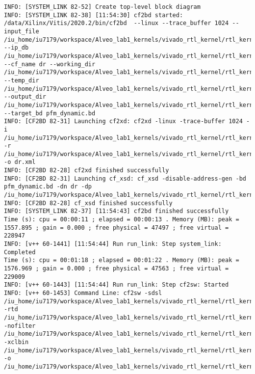 \begin{lstlisting}[label=func,breaklines=true,breakatwhitespace=false,caption=СОДЕРЖИМОЕ LOG-ФАЙЛА.]
INFO: [SYSTEM_LINK 82-52] Create top-level block diagram
INFO: [SYSTEM_LINK 82-38] [11:54:30] cf2bd started: /data/Xilinx/Vitis/2020.2/bin/cf2bd  --linux --trace_buffer 1024 --input_file /iu_home/iu7179/workspace/Alveo_lab1_kernels/vivado_rtl_kernel/rtl_kernel_wizard_0_ex/exports/_x/link/sys_link/cfgraph/cfgen_cfgraph.xml --ip_db /iu_home/iu7179/workspace/Alveo_lab1_kernels/vivado_rtl_kernel/rtl_kernel_wizard_0_ex/exports/_x/link/sys_link/_sysl/.cdb/xd_ip_db.xml --cf_name dr --working_dir /iu_home/iu7179/workspace/Alveo_lab1_kernels/vivado_rtl_kernel/rtl_kernel_wizard_0_ex/exports/_x/link/sys_link/_sysl/.xsd --temp_dir /iu_home/iu7179/workspace/Alveo_lab1_kernels/vivado_rtl_kernel/rtl_kernel_wizard_0_ex/exports/_x/link/sys_link --output_dir /iu_home/iu7179/workspace/Alveo_lab1_kernels/vivado_rtl_kernel/rtl_kernel_wizard_0_ex/exports/_x/link/int --target_bd pfm_dynamic.bd
INFO: [CF2BD 82-31] Launching cf2xd: cf2xd -linux -trace-buffer 1024 -i /iu_home/iu7179/workspace/Alveo_lab1_kernels/vivado_rtl_kernel/rtl_kernel_wizard_0_ex/exports/_x/link/sys_link/cfgraph/cfgen_cfgraph.xml -r /iu_home/iu7179/workspace/Alveo_lab1_kernels/vivado_rtl_kernel/rtl_kernel_wizard_0_ex/exports/_x/link/sys_link/_sysl/.cdb/xd_ip_db.xml -o dr.xml
INFO: [CF2BD 82-28] cf2xd finished successfully
INFO: [CF2BD 82-31] Launching cf_xsd: cf_xsd -disable-address-gen -bd pfm_dynamic.bd -dn dr -dp /iu_home/iu7179/workspace/Alveo_lab1_kernels/vivado_rtl_kernel/rtl_kernel_wizard_0_ex/exports/_x/link/sys_link/_sysl/.xsd
INFO: [CF2BD 82-28] cf_xsd finished successfully
INFO: [SYSTEM_LINK 82-37] [11:54:43] cf2bd finished successfully
Time (s): cpu = 00:00:11 ; elapsed = 00:00:13 . Memory (MB): peak = 1557.895 ; gain = 0.000 ; free physical = 47497 ; free virtual = 228947
INFO: [v++ 60-1441] [11:54:44] Run run_link: Step system_link: Completed
Time (s): cpu = 00:01:18 ; elapsed = 00:01:22 . Memory (MB): peak = 1576.969 ; gain = 0.000 ; free physical = 47563 ; free virtual = 229009
INFO: [v++ 60-1443] [11:54:44] Run run_link: Step cf2sw: Started
INFO: [v++ 60-1453] Command Line: cf2sw -sdsl /iu_home/iu7179/workspace/Alveo_lab1_kernels/vivado_rtl_kernel/rtl_kernel_wizard_0_ex/exports/_x/link/int/sdsl.dat -rtd /iu_home/iu7179/workspace/Alveo_lab1_kernels/vivado_rtl_kernel/rtl_kernel_wizard_0_ex/exports/_x/link/int/cf2sw.rtd -nofilter /iu_home/iu7179/workspace/Alveo_lab1_kernels/vivado_rtl_kernel/rtl_kernel_wizard_0_ex/exports/_x/link/int/cf2sw_full.rtd -xclbin /iu_home/iu7179/workspace/Alveo_lab1_kernels/vivado_rtl_kernel/rtl_kernel_wizard_0_ex/exports/_x/link/int/xclbin_orig.xml -o /iu_home/iu7179/workspace/Alveo_lab1_kernels/vivado_rtl_kernel/rtl_kernel_wizard_0_ex/exports/_x/link/int/xclbin_orig.1.xml

\end{lstlisting}
